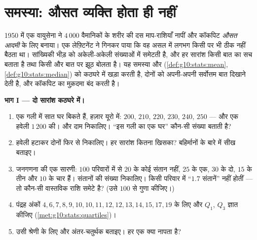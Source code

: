 \section{समस्या: औसत व्यक्ति होता ही नहीं}

\begin{problem}[{सप्ताहांत समस्या --- माध्य बनाम माध्यिका: बहिर्मान,
अंक-सुधार, सड़क किनारे का गोदाम, और वह कॉकपिट जो किसी के लिए नहीं बना}]
\label{pb:g10:stats:1}
1950 में एक वायुसेना ने $4\,000$ वैमानिकों के शरीर की दस माप-राशियाँ नापीं और
कॉकपिट \emph{औसत आदमी} के लिए बनाया। एक लेफ़्टिनेंट ने गिनकर पाया कि वह
असल में लगभग किसी पर भी ठीक नहीं बैठता था। सांख्यिकी भीड़ को अकेली-अकेली
संख्याओं में समेटती है, और हर सारांश किसी बात का सच बताता है तथा किसी और बात
पर झूठ बोलता है। यह समस्या  और  (\cref{def:g10:stats:mean}, \cref{def:g10:stats:median}) को कठघरे में
खड़ा करती है, दोनों को अपनी-अपनी सर्वोत्तम बात दिखाने देती है, और कॉकपिट का
मुक़दमा बंद करती है।

\medskip
\noindent\textbf{भाग I --- दो सारांश कठघरे में।}
\begin{enumerate}
  \item एक गली में सात घर बिकते हैं, हज़ार यूरो में: $200$, $210$, $220$,
        $230$, $240$, $250$ --- और एक हवेली $1\,200$ की।  और 
        दाम निकालिए। ``इस गली का एक घर'' कौन-सी संख्या बताती है?
  \item हवेली हटाकर दोनों फिर से निकालिए। हर सारांश कितना खिसका? बहिर्मानों
        के बारे में सीख बताइए।
  \item जनगणना की एक सारणी: $100$ परिवारों में से $20$ के कोई संतान नहीं,
        $25$ के एक, $30$ के दो, $15$ के तीन और $10$ के चार हैं।
        संतानों की  संख्या निकालिए। किसी परिवार में ``$1.7$ संतानें''
        नहीं होतीं --- तो  कौन-सी वास्तविक राशि समेटे है? (उसे $100$
        से गुणा कीजिए।)
  \item पंद्रह अंकों $4, 6, 7, 8, 9, 10, 10, 11, 12, 12, 13, 14, 15, 17, 19$ के लिए  और  $Q_1$, $Q_3$ ज्ञात
        कीजिए (\cref{met:g10:stats:quartiles})।
  \item उसी श्रेणी के लिए  और अंतर-चतुर्थक  बताइए। हर एक क्या
        नापता है?
\end{enumerate}


\end{problem}
